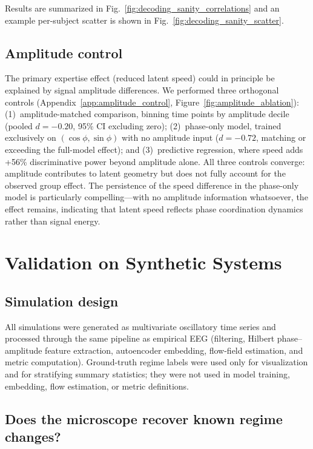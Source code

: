 \documentclass[5p,twocolumn,authoryear]{elsarticle}
\newcommand{\figref}[1]{Fig.~\ref{#1}}
\begin{document}
Results are summarized in \figref{fig:decoding_sanity_correlations} and an example per-subject scatter is shown in \figref{fig:decoding_sanity_scatter}.

\subsection{Amplitude control}
The primary expertise effect (reduced latent speed) could in principle be explained by signal amplitude differences. We performed three orthogonal controls (Appendix~\ref{app:amplitude_control}, Figure~\ref{fig:amplitude_ablation}): (1)~amplitude-matched comparison, binning time points by amplitude decile (pooled $d = -0.20$, 95\% CI excluding zero); (2)~phase-only model, trained exclusively on $(\cos\phi, \sin\phi)$ with no amplitude input ($d = -0.72$, matching or exceeding the full-model effect); and (3)~predictive regression, where speed adds +56\% discriminative power beyond amplitude alone. All three controls converge: amplitude contributes to latent geometry but does not fully account for the observed group effect. The persistence of the speed difference in the phase-only model is particularly compelling---with no amplitude information whatsoever, the effect remains, indicating that latent speed reflects phase coordination dynamics rather than signal energy.

\section{Validation on Synthetic Systems}

\subsection{Simulation design}

All simulations were generated as multivariate oscillatory time series and processed through the same pipeline as empirical EEG (filtering, Hilbert phase--amplitude feature extraction, autoencoder embedding, flow-field estimation, and metric computation). Ground-truth regime labels were used only for visualization and for stratifying summary statistics; they were not used in model training, embedding, flow estimation, or metric definitions.

\subsection{Does the microscope recover known regime changes?}
\label{sec:sim_validation}
\end{document}
